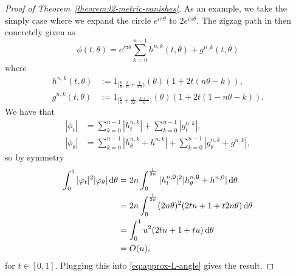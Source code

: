 \begin{proof}[Proof of Theorem~\ref{theorem:l2-metric-vanishes}]
As an example, we take the simply case where we expand the circle $e^{i\pi\theta}$ to
$2e^{i\pi\theta}$. The zigzag path in then concretely given as
\begin{equation*}
  \phi(t,\theta) = e^{i\pi\theta}
  \sum_{k=0}^{n-1}
  h^{n,k}(t,\theta) + g^{n,k}(t,\theta)
\end{equation*}
where
\begin{equation*}
  \begin{aligned}
    h^{n,k}(t,\theta) & := 1_{[\frac{k}{n},\frac{k}{n} +
      \frac{1}{2n})}(\theta) \left( 1+2t(n\theta-k) \right), \\
    g^{n,k}(t,\theta) & := 1_{[\frac{k}{n} + \frac{1}{2n},\frac{k+1}{n})}(\theta)
    \left( 1+2t(1-n\theta-k) \right).
  \end{aligned}
\end{equation*}
We have that
\begin{equation*}
  \begin{aligned}
    |\phi_t| & = \sum_{k=0}^{n-1} |h^{n,k}_t| + \sum_{k=0}^{n-1}
    |g^{n,k}_t|, \\
    |\phi_{\theta}| & = \sum_{k=0}^{n-1} |h^{n,k}_{\theta} + h^{n,k} | +
    \sum_{k=0}^{n-1}
    |g^{n,k}_{\theta} + g^{n,k} |,
  \end{aligned}
\end{equation*}
so by symmetry
\begin{equation*}
  \begin{aligned}
    \int_{0}^{1}
    |\varphi_t|^2   |\varphi_{\theta}|
    \mathop{}\!\mathrm{d} \theta
    & =
    2n \int_{0}^{\frac{1}{2n}} |h^{n,0}_t|^2 |h^{n,0}_{\theta} + h^{n,0} |
    \mathop{}\!\mathrm{d} \theta \\
    & = 2n \int_{0}^{\frac{1}{2n}}
    (2n\theta)^2(2tn+1+t2n\theta) \mathop{}\!\mathrm{d} \theta \\
    & = \int_{0}^1
    u^2(2tn+1+t u) \mathop{}\!\mathrm{d} \theta \\
    & = O(n),
  \end{aligned}
\end{equation*}
for $t\in[0,1]$. Plugging this into \eqref{eq:approx-L-angle} gives the result.
\end{proof}




